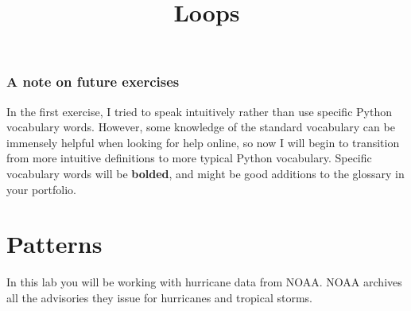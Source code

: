 \documentclass{article}
\begin{document}
\title{Loops}
\maketitle

\subsubsection*{A note on future exercises}
In the first exercise, I tried to speak intuitively rather than use specific Python vocabulary words.  However, some knowledge of the standard vocabulary can be immensely helpful when looking for help online, so now I will begin to transition from more intuitive definitions to more typical Python vocabulary.  Specific vocabulary words will be \textbf{bolded}, and might be good additions to the glossary in your portfolio.
\section{Patterns}
In this lab you will be working with hurricane data from NOAA.  NOAA archives all the advisories they issue for hurricanes and tropical storms.  
\end{document}
